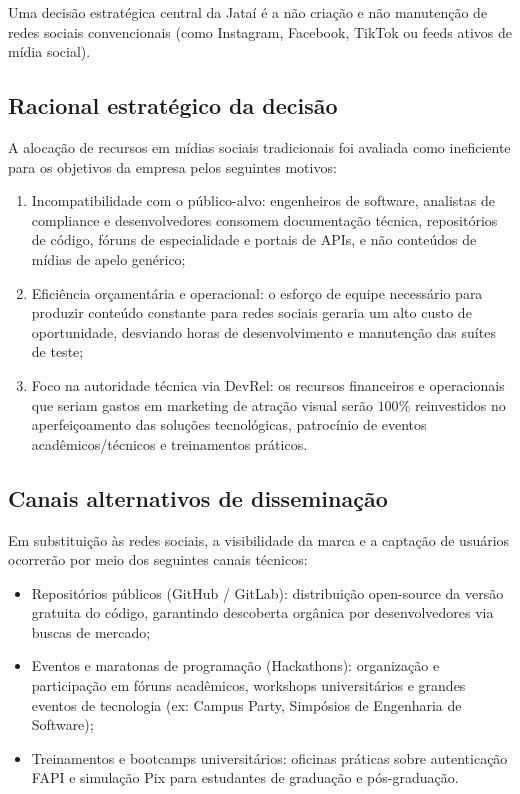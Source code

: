\documentclass[
  12pt,
  openright,
  oneside,
  a4paper,
  brazilian
]{abntex2}
\begin{document}
Uma decisão estratégica central da Jataí é a não criação e não manutenção de redes sociais convencionais (como Instagram, Facebook, TikTok ou feeds ativos de mídia social).

\subsection{Racional estratégico da decisão}
A alocação de recursos em mídias sociais tradicionais foi avaliada como ineficiente para os objetivos da empresa pelos seguintes motivos:
\begin{enumerate}
    \item{Incompatibilidade com o público-alvo:} engenheiros de software, analistas de compliance e desenvolvedores consomem documentação técnica, repositórios de código, fóruns de especialidade e portais de APIs, e não conteúdos de mídias de apelo genérico;
    \item{Eficiência orçamentária e operacional:} o esforço de equipe necessário para produzir conteúdo constante para redes sociais geraria um alto custo de oportunidade, desviando horas de desenvolvimento e manutenção das suítes de teste;
    \item{Foco na autoridade técnica via DevRel:} os recursos financeiros e operacionais que seriam gastos em marketing de atração visual serão $100\%$ reinvestidos no aperfeiçoamento das soluções tecnológicas, patrocínio de eventos acadêmicos/técnicos e treinamentos práticos.
\end{enumerate}

\subsection{Canais alternativos de disseminação}
Em substituição às redes sociais, a visibilidade da marca e a captação de usuários ocorrerão por meio dos seguintes canais técnicos:
\begin{itemize}
    \item{Repositórios públicos (GitHub / GitLab):} distribuição open-source da versão gratuita do código, garantindo descoberta orgânica por desenvolvedores via buscas de mercado;
    \item{Eventos e maratonas de programação (Hackathons):} organização e participação em fóruns acadêmicos, workshops universitários e grandes eventos de tecnologia (ex: Campus Party, Simpósios de Engenharia de Software);
    \item{Treinamentos e bootcamps universitários:} oficinas práticas sobre autenticação FAPI e simulação Pix para estudantes de graduação e pós-graduação.
\end{itemize}
\end{document}
